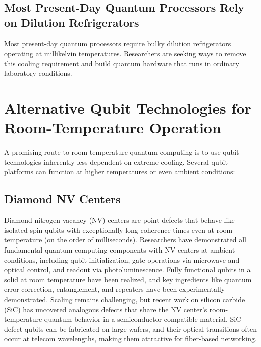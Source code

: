 \documentclass[11pt]{article}
\begin{document}
\subsection*{Most Present-Day Quantum Processors Rely on Dilution Refrigerators}

Most present-day quantum processors require bulky dilution refrigerators operating at millikelvin temperatures. Researchers are seeking ways to remove this cooling requirement and build quantum hardware that runs in ordinary laboratory conditions.

\section{Alternative Qubit Technologies for Room-Temperature Operation}
\label{sec:altqubits}

A promising route to room-temperature quantum computing is to use qubit technologies inherently less dependent on extreme cooling. Several qubit platforms can function at higher temperatures or even ambient conditions:

\subsection{Diamond NV Centers}
Diamond nitrogen-vacancy (NV) centers are point defects that behave like isolated spin qubits with exceptionally long coherence times even at room temperature (on the order of milliseconds). Researchers have demonstrated all fundamental quantum computing components with NV centers at ambient conditions, including qubit initialization, gate operations via microwave and optical control, and readout via photoluminescence. Fully functional qubits in a solid at room temperature have been realized, and key ingredients like quantum error correction, entanglement, and repeaters have been experimentally demonstrated. Scaling remains challenging, but recent work on silicon carbide (SiC) has uncovered analogous defects that share the NV center’s room-temperature quantum behavior in a semiconductor-compatible material. SiC defect qubits can be fabricated on large wafers, and their optical transitions often occur at telecom wavelengths, making them attractive for fiber-based networking.
\end{document}
